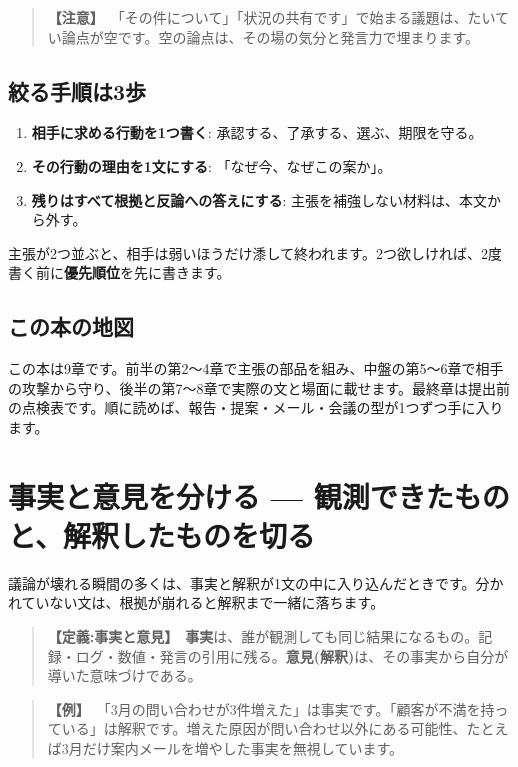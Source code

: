 \documentclass{article}
\begin{document}
\begin{quote}
\textbf{【注意】}\ 「その件について」「状況の共有です」で始まる議題は、たいてい論点が空です。空の論点は、その場の気分と発言力で埋まります。
\end{quote}

\subsection{絞る手順は3歩}

\begin{enumerate}
\item \textbf{相手に求める行動を1つ書く}: 承認する、了承する、選ぶ、期限を守る。
\item \textbf{その行動の理由を1文にする}: 「なぜ今、なぜこの案か」。
\item \textbf{残りはすべて根拠と反論への答えにする}: 主張を補強しない材料は、本文から外す。
\end{enumerate}

主張が2つ並ぶと、相手は弱いほうだけ潻して終われます。2つ欲しければ、2度書く前に\textbf{優先順位}を先に書きます。

\subsection{この本の地図}

この本は9章です。前半の第2〜4章で主張の部品を組み、中盤の第5〜6章で相手の攻撃から守り、後半の第7〜8章で実際の文と場面に載せます。最終章は提出前の点検表です。順に読めば、報告・提案・メール・会議の型が1つずつ手に入ります。

\section{事実と意見を分ける — 観測できたものと、解釈したものを切る}

議論が壊れる瞬間の多くは、事実と解釈が1文の中に入り込んだときです。分かれていない文は、根拠が崩れると解釈まで一緒に落ちます。

\begin{quote}
\textbf{【定義:事実と意見】}\ \textbf{事実}は、誰が観測しても同じ結果になるもの。記録・ログ・数値・発言の引用に残る。\textbf{意見(解釈)}は、その事実から自分が導いた意味づけである。
\end{quote}

\begin{quote}
\textbf{【例】}\ 「3月の問い合わせが3件増えた」は事実です。「顧客が不満を持っている」は解釈です。増えた原因が問い合わせ以外にある可能性、たとえば3月だけ案内メールを増やした事実を無視しています。
\end{quote}
\end{document}
